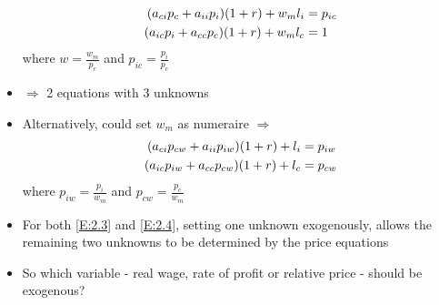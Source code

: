 \documentclass{article}
\begin{document}
\begin{itemize}
		\begin{align}
			(a_{ci} p_c + a_{ii} p_i) (1 + r) + w_m l_i &= p_{ic} \notag \\
			(a_{ic} p_i + a_{cc} p_c) (1 + r) + w_m l_c &= 1 \label{E:2.3}
		\end{align}
		where \( w = \frac{w_m}{p_c} \) and \( p_{ic} = \frac{p_i}{p_c} \)
		\item \( \Rightarrow \) 2 equations with 3 unknowns
		\item Alternatively, could set \( w_m \) as numeraire \( \Rightarrow \) 
		\begin{align}
			(a_{ci} p_{cw} + a_{ii} p_{iw}) (1 + r) + l_i &= p_{iw} \notag \\
			(a_{ic} p_{iw} + a_{cc} p_{cw}) (1 + r) + l_c &= p_{cw} \label{E:2.4}
		\end{align}
		where \( p_{iw} = \frac{p_i}{w_m} \) and \( p_{cw} = \frac{p_c}{w_m} \)
		\item For both \cref{E:2.3} and \cref{E:2.4}, setting one unknown exogenously, allows the remaining two unknowns to be determined by the price equations
		\item So which variable - real wage, rate of profit or relative price - should be exogenous? 
	\end{itemize}
\end{document}
